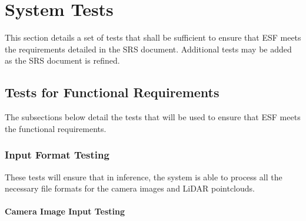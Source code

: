 \documentclass[12pt, titlepage]{article}
\newcommand{\ProjectName}{ESF }
\begin{document}
\section{System Tests} \label{System_Tests}

This section details a set of tests that shall be sufficient to ensure that \ProjectName{}meets the requirements detailed in the SRS document.
Additional tests may be added as the SRS document is refined.

\subsection{Tests for Functional Requirements}
The subsections below detail the tests that will be used to ensure that \ProjectName{}meets the functional requirements.

\subsubsection{Input Format Testing}

These tests will ensure that in inference, the system is able to process all the necessary
file formats for the camera images and LiDAR pointclouds.
		
\paragraph{Camera Image Input Testing}
\end{document}
